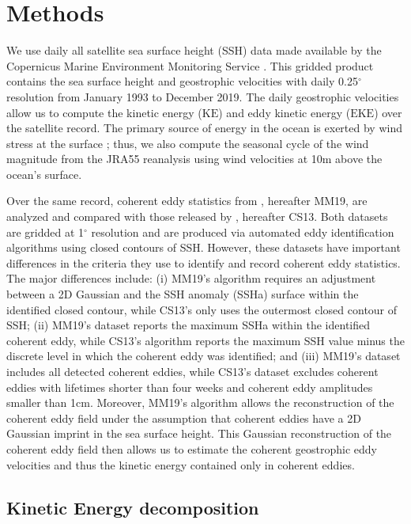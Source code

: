 \documentclass[draft,linenumbers]{agujournal2019}
\newcommand{\KE}{\textrm{KE}}
\newcommand{\EKE}{\textrm{EKE}}
\begin{document}
\section{Methods}
\label{sec:Methods}
	We use daily all satellite sea surface height (SSH) data made available by the Copernicus Marine Environment Monitoring Service \citep{CMEMS_aviso_2017}. 
	This gridded product contains the sea surface height and geostrophic velocities with daily 0.25$^\circ$ resolution from January 1993 to December 2019.
	The daily geostrophic velocities allow us to compute the kinetic energy ($\KE$) and eddy kinetic energy ($\EKE$) over the satellite record. The primary source of energy in the ocean is exerted by wind stress at the surface \citep{Ferrari_energy_2009}; thus, we also compute the seasonal cycle of the wind magnitude from the JRA55 reanalysis \citep{JMA_JRA55_2013} using wind velocities at 10m above the ocean's surface. 

	Over the same record, coherent eddy statistics from \citet{Martinez_TKE_2019}, hereafter MM19, are analyzed and compared with those released by \citet{Chelton_mesoscale_2013}, hereafter CS13. 
	Both datasets are gridded at 1$^\circ$ resolution and are produced via automated eddy identification algorithms using closed contours of SSH. However, these datasets have important differences in the criteria they use to identify and record coherent eddy statistics. 
	The major differences include: (i) MM19's algorithm requires an adjustment between a 2D Gaussian and the SSH anomaly (SSHa) surface within the identified closed contour, while CS13's only uses the outermost closed contour of SSH; (ii) MM19's dataset reports the maximum SSHa within the identified coherent eddy, while CS13's algorithm reports the maximum SSH value minus the discrete level in which the coherent eddy was identified; and (iii) MM19's dataset includes all detected coherent eddies, while CS13's dataset excludes coherent eddies with lifetimes shorter than four weeks and coherent eddy amplitudes smaller than 1cm. Moreover, MM19's algorithm allows the reconstruction of the coherent eddy field under the assumption that coherent eddies have a 2D Gaussian imprint in the sea surface height. This Gaussian reconstruction of the coherent eddy field  then allows us to estimate the coherent geostrophic eddy velocities and thus the kinetic energy contained only in coherent eddies.

	\subsection{Kinetic Energy decomposition}
\end{document}
